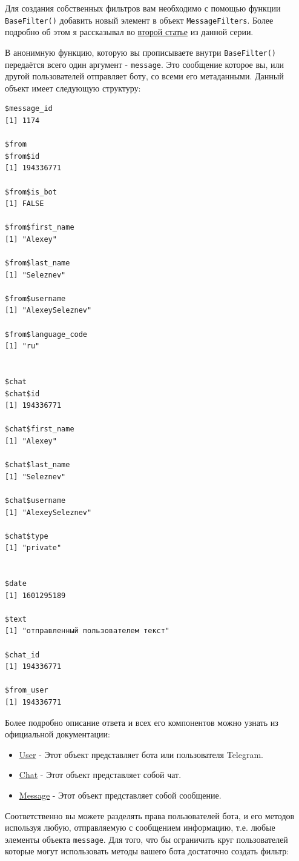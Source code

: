 \documentclass[
]{book}
\providecommand{\tightlist}{%
  \setlength{\itemsep}{0pt}\setlength{\parskip}{0pt}}
\begin{document}
Для создания собственных фильтров вам необходимо с помощью функции \texttt{BaseFilter()} добавить новый элемент в объект \texttt{MessageFilters}. Более подробно об этом я рассказывал во \href{https://habr.com/ru/post/515148/}{второй статье} из данной серии.

В анонимную функцию, которую вы прописываете внутри \texttt{BaseFilter()} передаётся всего один аргумент - \texttt{message}. Это сообщение которое вы, или другой пользователей отправляет боту, со всеми его метаданными. Данный объект имеет следующую структуру:

\begin{verbatim}
$message_id
[1] 1174

$from
$from$id
[1] 194336771

$from$is_bot
[1] FALSE

$from$first_name
[1] "Alexey"

$from$last_name
[1] "Seleznev"

$from$username
[1] "AlexeySeleznev"

$from$language_code
[1] "ru"


$chat
$chat$id
[1] 194336771

$chat$first_name
[1] "Alexey"

$chat$last_name
[1] "Seleznev"

$chat$username
[1] "AlexeySeleznev"

$chat$type
[1] "private"


$date
[1] 1601295189

$text
[1] "отправленный пользователем текст"

$chat_id
[1] 194336771

$from_user
[1] 194336771
\end{verbatim}

Более подробно описание ответа и всех его компонентов можно узнать из официальной документации:

\begin{itemize}
\tightlist
\item
  \href{https://tlgrm.ru/docs/bots/api\#user}{User} - Этот объект представляет бота или пользователя Telegram.
\item
  \href{https://tlgrm.ru/docs/bots/api\#chat}{Chat} - Этот объект представляет собой чат.
\item
  \href{https://tlgrm.ru/docs/bots/api\#message}{Message} - Этот объект представляет собой сообщение.
\end{itemize}

Соответственно вы можете разделять права пользователей бота, и его методов используя любую, отправляемую с сообщением информацию, т.е. любые элементы объекта \texttt{message}. Для того, что бы ограничить круг пользователей которые могут использовать методы вашего бота достаточно создать фильтр:
\end{document}
